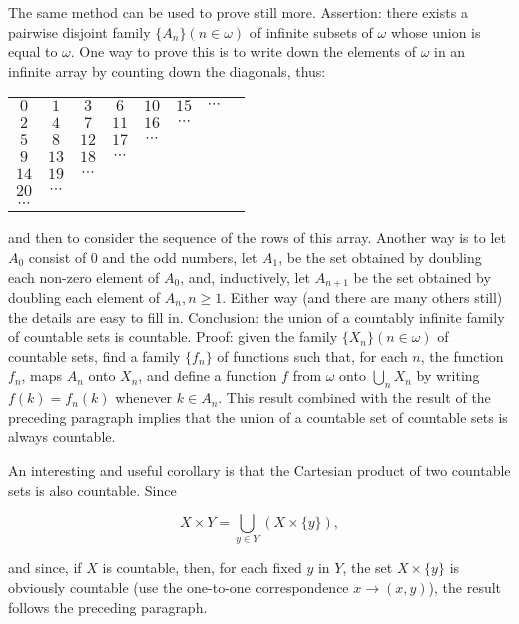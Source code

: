 The same method can be used to prove still more. Assertion: there exists a pairwise disjoint family $\{ A_{n} \} (n \in \omega)$ of infinite subsets of $\omega$ whose union is equal to $\omega$. One way to prove this is to write down the elements of $\omega$ in an infinite array by counting down the diagonals, thus: 

\begin{center}
\begin{tabular}{cccccccc}
$0$ & $1$ & $3$ & $6$ & $10$ & $15$ & $\cdots$  \\
$2$ & $4$ & $7$ & $11$ & $16$ & $\cdots$ & & \\
$5$ & $8$ & $12$ & $17$ & $\cdots$ & & & \\
$9$ & $13$ & $18$ & $\cdots$ & & & & \\
$14$ & $19$ & $\cdots$ & & & & & \\
$20$ & $\cdots$ & & & & & & \\
$\cdots $ & & & & & & & 
\end{tabular}
\end{center}

and then to consider the sequence of the rows of this array. Another way is to let $A_{0}$ consist of 0 and the odd numbers, let $A_{1}$, be the set obtained by doubling each non-zero element of $A_{0}$, and, inductively, let $A_{n+1}$ be the set obtained by doubling each element of $A_{n}, n \ge 1$. Either way (and there are many others still) the details are easy to fill in. Conclusion: the union of a countably infinite family of countable sets is countable. Proof: given the family $\{ X_{n} \} (n \in \omega)$ of countable sets, find a family $\{ f_{n} \}$ of functions such that, for each $n$, the function $f_{n}$, maps $A_{n}$ onto $X_{n}$, and define a function $f$ from $\omega$ onto $\bigcup_{n} X_{n}$ by writing $f(k) = f_{n}(k)$ whenever $k \in A_{n}$. This result combined with the result of the preceding paragraph implies that the union of a countable set of countable sets is always countable. 

An interesting and useful corollary is that the Cartesian product of two countable sets is also countable. Since 

\begin{equation*}
X \times Y = \bigcup_{y \in Y}(X \times \{ y \}),
\end{equation*}

and since, if $X$ is countable, then, for each fixed $y$ in $Y$, the set $X \times \{ y \}$ is obviously countable (use the one-to-one correspondence $x \rightarrow (x,y)$), the result follows the preceding paragraph. 

